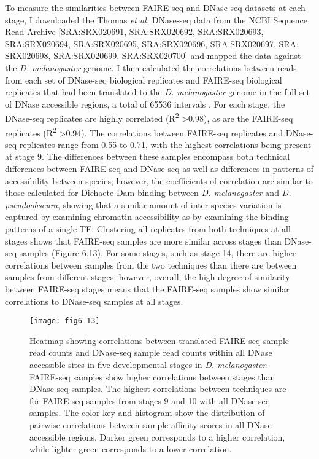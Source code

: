 To measure the similarities between FAIRE-seq and DNase-seq datasets at each stage, I downloaded the Thomas \emph{et al.} DNase-seq data from the NCBI Sequence Read Archive [SRA:SRX020691, SRA:SRX020692, SRA:SRX020693, SRA:SRX020694, SRA:SRX020695, SRA:SRX020696, SRA:SRX020697, SRA:\\
SRX020698, SRA:SRX020699, SRA:SRX020700] and mapped the data against the \emph{D. melanogaster} genome. I then calculated the correlations between reads from each set of DNase-seq biological replicates and FAIRE-seq biological replicates that had been translated to the \emph{D. melanogaster} genome in the full set of DNase accessible regions, a total of 65536 intervals \citep{thomas_dynamic_2011}. For each stage, the DNase-seq replicates are highly correlated (R\textsuperscript{2} \textgreater 0.98), as are the FAIRE-seq replicates (R\textsuperscript{2} \textgreater 0.94). The correlations between FAIRE-seq replicates and DNase-seq replicates range from 0.55 to 0.71, with the highest correlations being present at stage 9. The differences between these samples encompass both technical differences between FAIRE-seq and DNase-seq as well as differences in patterns of accessibility between species; however, the coefficients of correlation are similar to those calculated for Dichaete-Dam binding between \emph{D. melanogaster} and \emph{D. pseudoobscura}, showing that a similar amount of inter-species variation is captured by examining chromatin accessibility as by examining the binding patterns of a single TF. Clustering all replicates from both techniques at all stages shows that FAIRE-seq samples are more similar across stages than DNase-seq samples (Figure 6.13). For some stages, such as stage 14, there are higher correlations between samples from the two techniques than there are between samples from different stages; however, overall, the high degree of similarity between FAIRE-seq stages means that the FAIRE-seq samples show similar correlations to DNase-seq samples at all stages.

\begin{figure}
\centering
\texttt{[image: fig6-13]}
\caption[Correlations between translated FAIRE-seq sample read counts and DNase-seq sample read counts within all DNase accessible sites in five developmental stages in \emph{D. melanogaster}]{Heatmap showing correlations between translated FAIRE-seq sample read counts and DNase-seq sample read counts within all DNase accessible sites in five developmental stages in \emph{D. melanogaster}. FAIRE-seq samples show higher correlations between stages than DNase-seq samples. The highest correlations between techniques are for FAIRE-seq samples from stages 9 and 10 with all DNase-seq samples. The color key and histogram show the distribution of pairwise correlations between sample affinity scores in all DNase accessible regions. Darker green corresponds to a higher correlation, while lighter green corresponds to a lower correlation.}
\label{Figure 6.13}
\end{figure}

